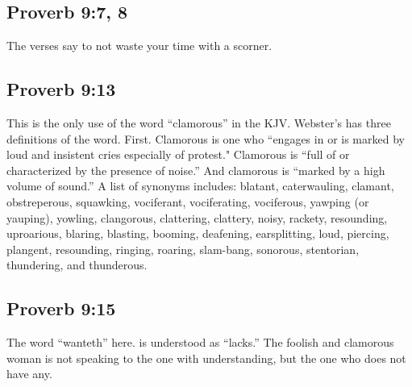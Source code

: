 \subsection{Proverb 9:7, 8}
The verses say to not waste your time with a scorner.

\subsection{Proverb 9:13}
This is the only use of the word ``clamorous'' in the KJV. Webster's has three definitions of the word. First. Clamorous is one who ``engages in or is marked by loud and insistent cries especially of protest."  Clamorous is ``full of or characterized by the presence of noise.'' And clamorous is ``marked by a high volume of sound.''  A list of synonyms includes: blatant, caterwauling, clamant, obstreperous, squawking, vociferant, vociferating, vociferous, yawping (or yauping), yowling, clangorous, clattering, clattery, noisy, rackety, resounding, uproarious, blaring, blasting, booming, deafening, earsplitting, loud, piercing, plangent, resounding, ringing, roaring, slam-bang, sonorous, stentorian, thundering, and thunderous. 

\subsection{Proverb 9:15}
The word ``wanteth'' here. is understood as ``lacks.'' The foolish and clamorous woman is not speaking to the one with understanding, but the one who does not have any.

